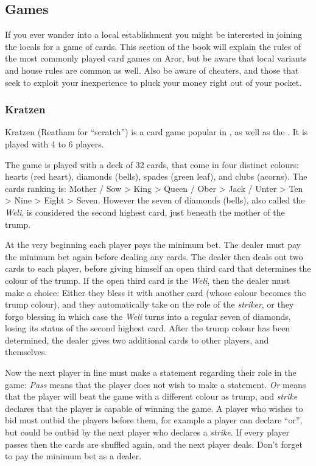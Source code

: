 \subsection{Games}
\label{sec:Games}

If you ever wander into a local establishment you might be interested in
joining the locals for a game of cards. This section of the book will explain
the rules of the most commonly played card games on Aror, but be aware that
local variants and house rules are common as well. Also be aware of cheaters,
and those that seek to exploit your inexperience to pluck your money right
out of your pocket.

\subsubsection{Kratzen}
\label{sec:Kratzen}

Kratzen (Reatham for ``scratch'') is a card game popular in
, as well as the . It is
played with 4 to 6 players.

The game is played with a deck of 32 cards, that come in four distinct
colours: hearts (red heart), diamonds (bells), spades (green leaf), and clubs
(acorns). The cards ranking is: Mother / Sow > King > Queen / Ober > Jack /
Unter > Ten > Nine > Eight > Seven. However the seven of diamonds (bells),
also called the \emph{Weli}, is considered the second highest card, just beneath
the mother of the trump.

At the very beginning each player pays the minimum bet. The dealer must pay
the minimum bet again before dealing any cards. The dealer then deals out two
cards to each player, before giving himself an open third card that determines
the colour of the trump. If the open third card is the \emph{Weli}, then the
dealer must make a choice: Either they bless it with another card (whose
colour becomes the trump colour), and they automatically take on the role of
the \emph{striker}, or they forgo blessing in which case the \emph{Weli} turns
into a regular seven of diamonds, losing its status of the second highest
card. After the trump colour has been determined, the dealer gives two
additional cards to other players, and themselves.

Now the next player in line must make a statement regarding their role in the
game: \emph{Pass} means that the player does not wish to make a
statement. \emph{Or} means that the player will beat the game with a different
colour as trump, and \emph{strike} declares that the player is capable of
winning the game. A player who wishes to bid must outbid the players before
them, for example a player can declare ``or'', but could be outbid by the next
player who declares a \emph{strike}. If every player passes then the cards are
shuffled again, and the next player deals. Don't forget to pay the minimum bet
as a dealer.

